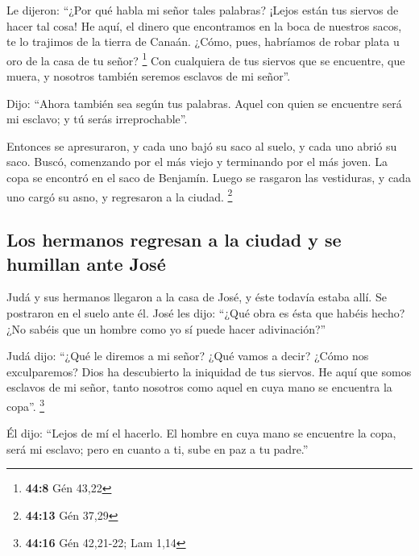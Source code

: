 \begin{paracol}{2}
 Le dijeron: ``¿Por qué habla mi señor tales palabras?
¡Lejos están tus siervos de hacer tal cosa!  He aquí, el
dinero que encontramos en la boca de nuestros sacos, te lo trajimos de
la tierra de Canaán. ¿Cómo, pues, habríamos de robar plata u oro de la
casa de tu señor? \footnote{\textbf{44:8} Gén 43,22}  Con
cualquiera de tus siervos que se encuentre, que muera, y nosotros
también seremos esclavos de mi señor''.

 Dijo: ``Ahora también sea según tus palabras. Aquel con
quien se encuentre será mi esclavo; y tú serás irreprochable''.

 Entonces se apresuraron, y cada uno bajó su saco al
suelo, y cada uno abrió su saco.  Buscó, comenzando por
el más viejo y terminando por el más joven. La copa se encontró en el
saco de Benjamín.  Luego se rasgaron las vestiduras, y
cada uno cargó su asno, y regresaron a la ciudad. \footnote{\textbf{44:13}
  Gén 37,29}

\hypertarget{los-hermanos-regresan-a-la-ciudad-y-se-humillan-ante-josuxe9}{%
\subsection{Los hermanos regresan a la ciudad y se humillan ante
José}\label{los-hermanos-regresan-a-la-ciudad-y-se-humillan-ante-josuxe9}}

 Judá y sus hermanos llegaron a la casa de José, y éste
todavía estaba allí. Se postraron en el suelo ante él. 
José les dijo: ``¿Qué obra es ésta que habéis hecho? ¿No sabéis que un
hombre como yo sí puede hacer adivinación?''

 Judá dijo: ``¿Qué le diremos a mi señor? ¿Qué vamos a
decir? ¿Cómo nos exculparemos? Dios ha descubierto la iniquidad de tus
siervos. He aquí que somos esclavos de mi señor, tanto nosotros como
aquel en cuya mano se encuentra la copa''. \footnote{\textbf{44:16} Gén
  42,21-22; Lam 1,14}

 Él dijo: ``Lejos de mí el hacerlo. El hombre en cuya
mano se encuentre la copa, será mi esclavo; pero en cuanto a ti, sube en
paz a tu padre.''


\end{paracol}
